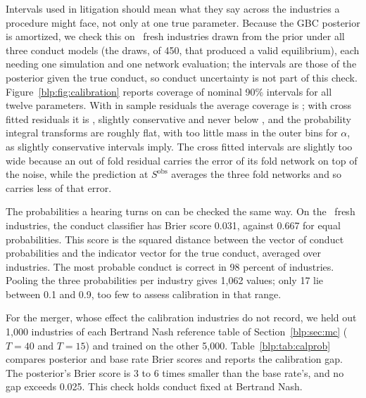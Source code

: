 Intervals used in litigation should mean what they say across the industries a procedure might face, not only at one true parameter. Because the GBC posterior is amortized, we check this on \numncal\ fresh industries drawn from the prior under all three conduct models (the draws, of 450, that produced a valid equilibrium), each needing one simulation and one network evaluation; the intervals are those of the posterior given the true conduct, so conduct uncertainty is not part of this check. Figure~\ref{blp:fig:calibration}
reports coverage of nominal 90\% intervals for all twelve parameters. With in sample residuals the
average coverage is \numcovnaive; with cross fitted residuals it is \numcovavg, slightly conservative and never below
\numcovmin, and the probability integral transforms are roughly flat, with too little mass in the outer bins for $\alpha$, as slightly conservative intervals imply. The cross fitted intervals are slightly too wide because an out of fold residual carries the error of its fold network on top of the noise, while the prediction at $S^{\mathrm{obs}}$ averages the three fold networks and so carries less of that error.



The probabilities a hearing turns on can be checked the same way. On the \numncal\ fresh industries, the conduct classifier has Brier score 0.031, against 0.667 for equal probabilities. This score is the squared distance between the vector of conduct probabilities and the indicator vector for the true conduct, averaged over industries. The most probable conduct is correct in 98 percent of industries. Pooling the three probabilities per industry gives 1{,}062 values; only 17 lie between 0.1 and 0.9, too few to assess calibration in that range.

For the merger, whose effect the calibration industries do not record, we held out 1{,}000 industries of each Bertrand Nash reference table of Section~\ref{blp:sec:mc} ($T=40$ and $T=15$) and trained on the other 5{,}000. Table~\ref{blp:tab:calprob} compares posterior and base rate Brier scores and reports the calibration gap. The posterior's Brier score is 3 to 6 times smaller than the base rate's, and no gap exceeds 0.025. This check holds conduct fixed at Bertrand Nash.

